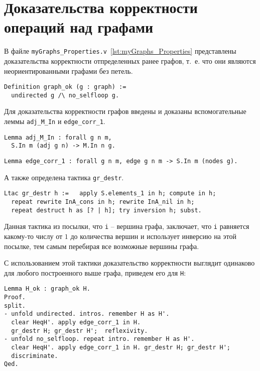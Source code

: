 \section{Доказательства корректности операций над графами}

В файле {\tt myGraphs\_Properties.v}~\ref{lst:myGraphs_Properties} представлены доказательства корректности отпределенных ранее графов, т.~е. что они являются неориентированными графами без петель. 

\begin {verbatim}
Definition graph_ok (g : graph) := 
  undirected g /\ no_selfloop g.
\end{verbatim}

Для доказательства корректности графов введены и доказаны вспомогательные леммы {\tt adj\_M\_In} и {\tt edge\_corr\_1}.

\begin {verbatim}
Lemma adj_M_In : forall g n m,
  S.In m (adj g n) -> M.In n g.
\end{verbatim}

\begin {verbatim}
Lemma edge_corr_1 : forall g n m, edge g n m -> S.In m (nodes g).
\end{verbatim}

А также определена тактика {\tt gr\_destr}.

\begin {verbatim}
Ltac gr_destr h :=   apply S.elements_1 in h; compute in h;
  repeat rewrite InA_cons in h; rewrite InA_nil in h;
  repeat destruct h as [? | h]; try inversion h; subst.
\end{verbatim}

Данная тактика из посылки, что {\tt i} -- вершина графа, заключает, что {\tt i} равняется какому-то числу от $1$ до количества вершин и использует инверсию на этой посылке, тем самым перебирая все возможные вершины графа.

С использованием этой тактики доказательство корректности выглядит одинаково для любого построенного выше графа, приведем его для {\tt H}:

\begin{verbatim}
Lemma H_ok : graph_ok H.
Proof.
split.
- unfold undirected. intros. remember H as H'.
  clear HeqH'. apply edge_corr_1 in H.
  gr_destr H; gr_destr H';  reflexivity.
- unfold no_selfloop. repeat intro. remember H as H'.
  clear HeqH'. apply edge_corr_1 in H. gr_destr H; gr_destr H';
  discriminate.
Qed.
\end{verbatim}


